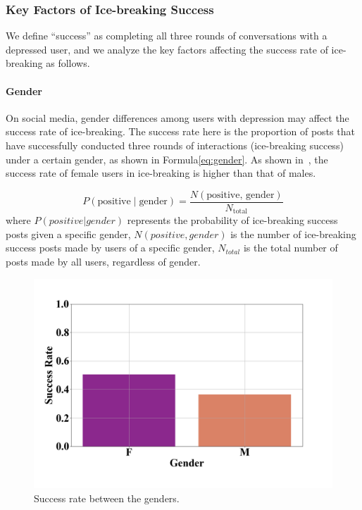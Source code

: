 \subsubsection{Key Factors of Ice-breaking Success}
We define ``success'' as completing all three rounds of conversations with a depressed user, and we analyze the key factors affecting the success rate of ice-breaking as follows.
\paragraph{Gender}
On social media, gender differences among users with depression may affect the success rate 
of ice-breaking. The success rate here is the proportion of posts that have successfully conducted three rounds of interactions (ice-breaking success) under a certain gender, as shown in Formula\ref{eq:gender}. As shown in~, the success rate of female users in ice-breaking is higher than that of males.

\begin{equation}
    P(\text{positive} \mid \text{gender}) = \frac{N(\text{positive, gender})}{N_{\text{total}}}
    \label{eq:gender}
\end{equation}
\noindent
where $P (positive | gender)$ represents the probability of ice-breaking success posts given a specific gender, $N(positive, gender)$ is the number of ice-breaking success posts made by users of a specific gender,  $N_{total}$ is the total number of posts made by all users, regardless of gender.

\begin{figure}[th]
    \centering
    \includegraphics[width=0.7\columnwidth]{images/success_gender.png}
    \caption{Success rate between the genders.}
    \label{fig:success_gender}
\end{figure}

